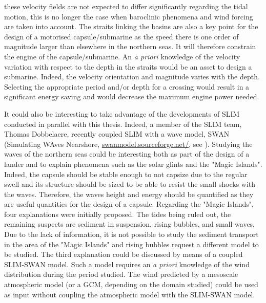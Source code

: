 these velocity fields are not expected to differ significantly regarding the tidal motion, this is no longer the case when baroclinic phenomena and wind forcing are taken into account. The straits linking the basins are also a key point for the design of a motorised capsule/submarine as the speed there is one order of magnitude larger than elsewhere in the northern seas. It will therefore constrain the engine of the capsule/submarine. An \textit{a priori} knowledge of the velocity variation with respect to the depth in the straits would be an asset to design a submarine. Indeed, the velocity orientation and magnitude varies with the depth. Selecting the appropriate period and/or depth for a crossing would result in a significant energy saving and would decrease the maximum engine power needed.

It could also be interesting to take advantage of the developments of SLIM conducted in parallel with this thesis. Indeed, a member of the SLIM team, Thomas Dobbelaere, recently coupled SLIM with a wave model, SWAN (Simulating WAves Nearshore, \url{swanmodel.sourceforge.net/}, see \cite{booij1997swan}). Studying the waves of the northern seas could be interesting both as part of the design of a lander and to explain phenomena such as the solar glints and the "Magic Islands". Indeed, the capsule should be stable enough to not capsize due to the regular swell and its structure should be sized to be able to resist the small shocks with the waves. Therefore, the waves height and energy should be quantified as they are useful quantities for the design of a capsule. Regarding the "Magic Islands", four explanations were initially proposed. The tides being ruled out, the remaining suspects are sediment in suspension, rising bubbles, and small waves. Due to the lack of information, it is not possible to study the sediment transport in the area of the "Magic Islands" and rising bubbles request a different model to be studied. The third explanation could be discussed by means of a coupled SLIM-SWAN model. Such a model requires an \textit{a priori} knowledge of the wind distribution during the period studied. The wind predicted by a mesoscale atmospheric model (or a GCM, depending on the domain studied) could be used as input without coupling the atmospheric model with the SLIM-SWAN model.


